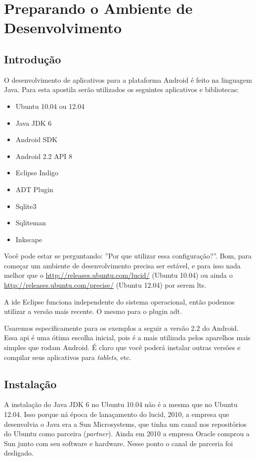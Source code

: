 \chapter{Preparando o Ambiente de Desenvolvimento}

\section{Introdução}

O desenvolvimento de aplicativos para a plataforma Android é feito na linguagem Java.
Para esta apostila serão utilizados os seguintes aplicativos e bibliotecas:

\begin{itemize}
	\item Ubuntu 10.04 ou 12.04
	\item Java JDK 6
	\item Android SDK
	\item Android 2.2 API 8
	\item Eclipse Indigo
	\item ADT Plugin
	\item Sqlite3
	\item Sqliteman
	\item Inkscape
\end{itemize}

Você pode estar se perguntando: ''Por que utilizar essa configuração?''. Bom, para começar
um ambiente de desenvolvimento precisa ser estável, e para isso nada melhor que o
\url{http://releases.ubuntu.com/lucid/} (Ubuntu 10.04) ou ainda o \url{http://releases.ubuntu.com/precise/}
(Ubuntu 12.04) por serem \gls{lts}.

A \gls{ide} Eclipse funciona independente do sistema operacional, então podemos utilizar a versão
mais recente. O mesmo para o plugin \gls{adt}.

Usaremos especificamente para os exemplos a seguir a versão 2.2 do Android. Essa \gls{api} é uma
ótima escolha inicial, pois é a mais utilizada pelos aparelhos mais simples que rodam Android.
É claro que você poderá instalar outras versões e compilar seus aplicativos para \textit{tablets}, etc.

\section{Instalação}

A instalação do Java JDK 6 no Ubuntu 10.04 não é a mesma que no Ubuntu 12.04. Isso porque ná época
de lanaçamento do \gls{lucid}, 2010, a empresa que desenvolvia o Java era a Sun Microsystems, que
tinha um canal nos repositórios do Ubuntu como parceira (\textit{partner}). Ainda em 2010 a empresa
Oracle comprou a Sun junto com seu software e hardware. Nesse ponto o canal de parceria foi desligado.


